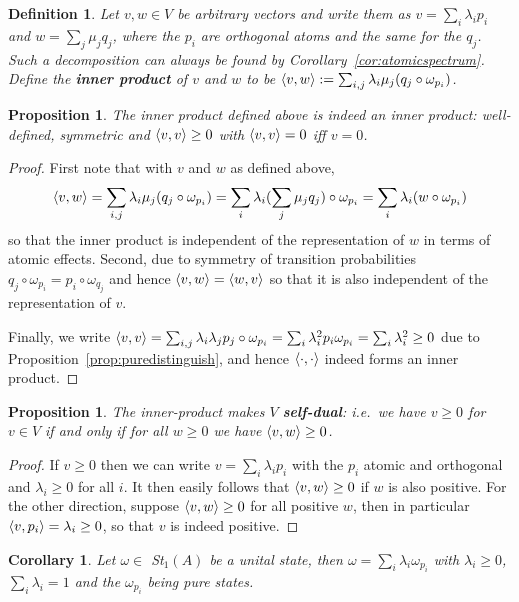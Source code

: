\documentclass[a4paper,onecolumn,10pt,accepted=2019-05-03, issue=1, volume=1, shorttitle=papers/compositionality-1-1]{compositionalityarticle}
\DeclarePairedDelimiter{\inn}{\langle}{\rangle}
\newcounter{counter}
\numberwithin{counter}{section}
\newtheorem{proposition}[counter]{Proposition}
\newtheorem{definition}[counter]{Definition}
\newtheorem{corollary}[counter]{Corollary}
\begin{document}
\begin{definition}
    Let $v,w \in V$ be arbitrary vectors and write them as $v=\sum_i \lambda_i p_i$ and $w=\sum_j \mu_j q_j$, where the $p_i$ are orthogonal atoms and the same for the $q_j$. Such a decomposition can always be found by Corollary~\ref{cor:atomicspectrum}. Define the \textbf{inner product} of $v$ and $w$ to be $\inn{v,w} := \sum_{i,j} \lambda_i \mu_j (q_j\circ\omega_{p_i})$.
\end{definition}
\begin{proposition}
    The inner product defined above is indeed an inner product: well-defined, symmetric and $\inn{v,v}\geq 0$ with $\inn{v,v}=0$ iff $v=0$.
\end{proposition}
\begin{proof}
    First note that with $v$ and $w$ as defined above, 
    $$\inn{v,w} = \sum_{i,j} \lambda_i \mu_j (q_j\circ\omega_{p_i}) = \sum_i \lambda_i (\sum_j \mu_j q_j)\circ\omega_{p_i} = \sum_i \lambda_i (w\circ\omega_{p_i})$$ 
    so that the inner product is independent of the representation of $w$ in terms of atomic effects. 
    Second, due to symmetry of transition probabilities $q_j\circ\omega_{p_i} = p_i\circ\omega_{q_j}$ and hence $\inn{v,w} = \inn{w,v}$ so that it is also independent of the representation of $v$.

    Finally, we write $\inn{v,v} = \sum_{i,j} \lambda_i \lambda_j p_j\circ\omega_{p_i} = \sum_i \lambda_i^2 p_i\omega_{p_i} = \sum_i \lambda_i^2\geq 0$ due to Proposition~\ref{prop:puredistinguish}, and hence $\inn{\cdot,\cdot}$ indeed forms an inner product.
\end{proof}
\begin{proposition}
    The inner-product makes $V$ \textbf{self-dual}: i.e.\ we have $v\geq 0$ for $v\in V$ if and only if for all $w\geq 0$ we have $\inn{v,w}\geq 0$.
\end{proposition}
\begin{proof}
    If $v\geq 0$ then we can write $v=\sum_i \lambda_i p_i$ with the $p_i$ atomic and orthogonal and $\lambda_i \geq 0$ for all $i$. It then easily follows that $\inn{v,w}\geq 0$ if $w$ is also positive. For the other direction, suppose $\inn{v,w}\geq 0$ for all positive $w$, then in particular $\inn{v,p_i} = \lambda_i \geq 0$, so that $v$ is indeed positive.
\end{proof}
\begin{corollary} \label{cor:purestateconvex}
    Let $\omega\in $ St$_1(A)$ be a unital state, then $\omega = \sum_i \lambda_i \omega_{p_i}$ with $\lambda_i\geq 0$, $\sum_i\lambda_i = 1$ and the $\omega_{p_i}$ being pure states.
\end{corollary}
\end{document}
